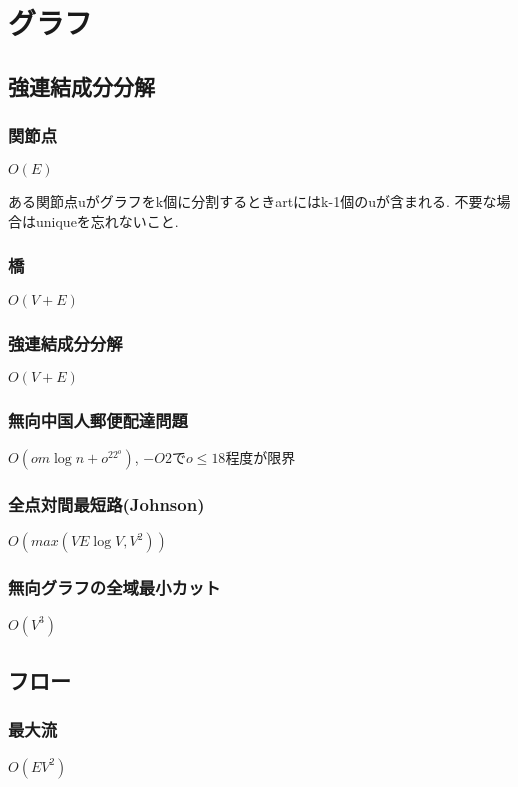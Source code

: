 

\section{グラフ}
\subsection{強連結成分分解}
\subsubsection{関節点}
$O(E)$\par
ある関節点uがグラフをk個に分割するときartにはk-1個のuが含まれる. 不要な場合はuniqueを忘れないこと.\par


\subsubsection{橋}
$O(V+E)$\par


\subsubsection{強連結成分分解}
$O(V+E)$\par


\subsubsection{無向中国人郵便配達問題}
$O(om\log n+o^22^o)$, $-O2$で$o\leq 18$程度が限界

\subsubsection{全点対間最短路(Johnson)}
$O(max(VE\log V, V^2))$

\subsubsection{無向グラフの全域最小カット}
$O(V^3)$


\subsection{フロー}
\subsubsection{最大流}
$O(EV^2)$\par


